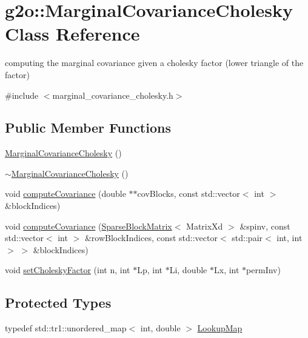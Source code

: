 \hypertarget{classg2o_1_1MarginalCovarianceCholesky}{}\section{g2o\+:\+:Marginal\+Covariance\+Cholesky Class Reference}
\label{classg2o_1_1MarginalCovarianceCholesky}


computing the marginal covariance given a cholesky factor (lower triangle of the factor)  




{\ttfamily \#include $<$marginal\+\_\+covariance\+\_\+cholesky.\+h$>$}

\subsection*{Public Member Functions}
\begin{DoxyCompactItemize}
\item 
\hyperlink{classg2o_1_1MarginalCovarianceCholesky_a1fab5946726badbb38c2b2aa54a0118c}{Marginal\+Covariance\+Cholesky} ()
\item 
\hyperlink{classg2o_1_1MarginalCovarianceCholesky_aafdc3a753d5b6f3fca95d5bcbca44442}{$\sim$\+Marginal\+Covariance\+Cholesky} ()
\item 
void \hyperlink{classg2o_1_1MarginalCovarianceCholesky_a0ea50dbda0558ca98faacafc8c9f48c9}{compute\+Covariance} (double $\ast$$\ast$cov\+Blocks, const std\+::vector$<$ int $>$ \&block\+Indices)
\item 
void \hyperlink{classg2o_1_1MarginalCovarianceCholesky_a77e7396fb18b334b4d707f41e5e05399}{compute\+Covariance} (\hyperlink{classg2o_1_1SparseBlockMatrix}{Sparse\+Block\+Matrix}$<$ Matrix\+Xd $>$ \&spinv, const std\+::vector$<$ int $>$ \&row\+Block\+Indices, const std\+::vector$<$ std\+::pair$<$ int, int $>$ $>$ \&block\+Indices)
\item 
void \hyperlink{classg2o_1_1MarginalCovarianceCholesky_a53bda8bc29bee2a7fb871c25a58ab191}{set\+Cholesky\+Factor} (int n, int $\ast$Lp, int $\ast$Li, double $\ast$Lx, int $\ast$perm\+Inv)
\end{DoxyCompactItemize}
\subsection*{Protected Types}
\begin{DoxyCompactItemize}
\item 
typedef std\+::tr1\+::unordered\+\_\+map$<$ int, double $>$ \hyperlink{classg2o_1_1MarginalCovarianceCholesky_a9925dd2e45479a7feb783ff71d93fdbc}{Lookup\+Map}
\end{DoxyCompactItemize}
